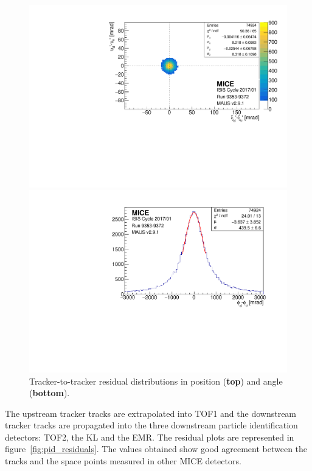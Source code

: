 \begin{figure} [!htb]
	\begin{minipage}[b]{.475\textwidth}
		\centering
		\includegraphics[width=\textwidth]{data_test/tkd_xpyp_res.pdf}
	\end{minipage}
	\hfill
	\begin{minipage}[b]{.475\textwidth}
		\centering
		\includegraphics[width=\textwidth]{data_test/tkd_phi_res.pdf}
	\end{minipage}
	\caption{Tracker-to-tracker residual distributions in position (\textbf{top}) and angle (\textbf{bottom}).}
	\label{fig:tracker_residuals}
\end{figure}

The upstream tracker tracks are extrapolated into TOF1 and the downstream tracker tracks are propagated into the three downstream particle identification detectors: TOF2, the KL and the EMR. The residual plots are represented in figure~\ref{fig:pid_residuals}. The values obtained show good agreement between the tracks and the space points measured in other MICE detectors.

